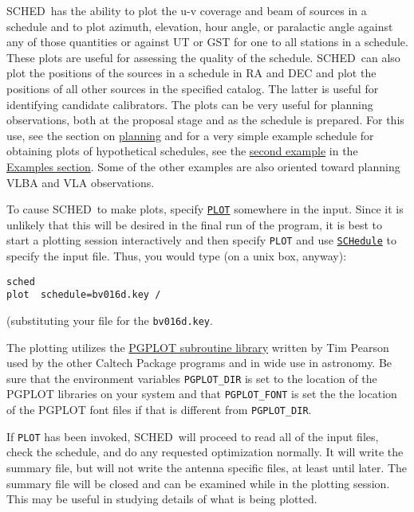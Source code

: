 \documentclass{report}
\newcommand{\schedb}{{\sc SCHED~}}
\begin{document}
\schedb has the ability to plot the u-v coverage and beam of sources in a
schedule and to plot azimuth, elevation, hour angle, or paralactic
angle against any of those quantities or against UT or GST for one to
all stations in a schedule.  These plots are useful for assessing the
quality of the schedule.  \schedb can also plot the positions of the
sources in a schedule in RA and DEC and plot the positions of all
other sources in the specified catalog.  The latter is useful for
identifying candidate calibrators.  The plots can be very useful
for planning observations, both at the proposal stage and as the
schedule is prepared.  For this use, see the section on
\hyperref[SEC:PLANNING]{planning}
and for a
very simple example schedule for obtaining plots of hypothetical
schedules, see the 
{\hyperref[SSEC:EXAMPLE3]{second example}} in the
\hyperref[SEC:EXAMPLES]{Examples section}.
Some of the other examples are also
oriented toward planning VLBA and VLA observations.

To cause \schedb to make plots, specify 
{\hyperref[MP:PLOT]{{\tt PLOT}}}
somewhere in the input.  Since it is unlikely that this will be
desired in the final run of the program, it is best to start a
plotting session interactively and then specify {\tt PLOT} and use
{\hyperref[MP:SCHEDULE]{{\tt SCHedule}}} to specify the input file.
Thus, you would type (on a unix box, anyway):

\begin{verbatim}
sched
plot  schedule=bv016d.key /
\end{verbatim}

(substituting your file for the {\tt bv016d.key}.

The plotting utilizes the 
{\href{http://www.astro.caltech.edu/~tjp/pgplot/}{{\sc PGPLOT} subroutine library}}
written by Tim
Pearson used by the other Caltech Package programs and in wide use in
astronomy.  Be sure that the environment variables {\tt PGPLOT\_DIR}
is set to the location of the {\sc PGPLOT} libraries on your system
and that {\tt PGPLOT\_FONT} is set the the location of the {\sc
PGPLOT} font files if that is different from {\tt PGPLOT\_DIR}.

If {\tt PLOT} has been invoked, \schedb will proceed to read all of
the input files, check the schedule, and do any requested optimization
normally.  It will write the summary file, but will not write the
antenna specific files, at least until later.  The summary file will
be closed and can be examined while in the plotting session.  This may
be useful in studying details of what is being plotted.
\end{document}
